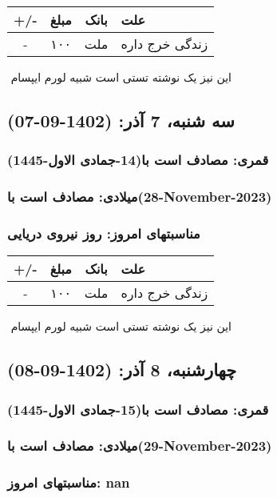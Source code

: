 \documentclass{article}
\newcommand{\rnote}[1]{\marginpar{\textcolor{color}{\StrSubstitute{\##1}{ }{\_}}}}
\newcommand{\myRow}[4]{
    #1 & #2 & #3 & #4 \\ \hline
}
\begin{document}
\begin{tabular}{ | c | c | c | p{5cm} |}
    \hline
    \myRow{ +/- }{مبلغ}{بانک}{علت}
    \myRow{-}{۱۰۰}{ملت}{زندگی خرج داره}
\end{tabular}
\newline
\newline

‌
\rnote{تست}
این نیز یک نوشته تستی است شبیه لورم ایپسام




\newpage
{}
\textcolor{color}{
\section{ سه شنبه، 7 آذر: (1402-09-07) }
\subsubsection*{قمری: مصادف است با(14-جمادی الاول-1445)} 
\subsubsection*{میلادی: مصادف است با(28-November-2023)}
\subsubsection*{مناسبتهای امروز: روز نیروی دریایی}
}


\begin{tabular}{ | c | c | c | p{5cm} |}
    \hline
    \myRow{ +/- }{مبلغ}{بانک}{علت}
    \myRow{-}{۱۰۰}{ملت}{زندگی خرج داره}
\end{tabular}
\newline
\newline

‌
\rnote{تست}
این نیز یک نوشته تستی است شبیه لورم ایپسام




\newpage
{}
\textcolor{color}{
\section{ چهارشنبه، 8 آذر: (1402-09-08) }
\subsubsection*{قمری: مصادف است با(15-جمادی الاول-1445)} 
\subsubsection*{میلادی: مصادف است با(29-November-2023)}
\subsubsection*{مناسبتهای امروز: nan}
}
\end{document}
